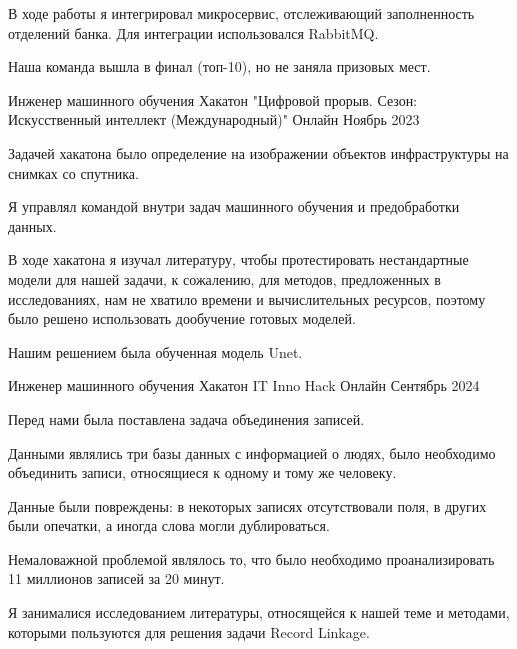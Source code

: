 \begin{cventries}
{\begin{cvitems}
    \item {В ходе работы я интегрировал микросервис, отслеживающий заполненность отделений банка. Для интеграции использовался RabbitMQ.}
    \item {Наша команда вышла в финал (топ-10), но не заняла призовых мест. }
  \end{cvitems}
}
\cventry
{Инженер машинного обучения} %
{Хакатон "Цифровой прорыв. Сезон: Искусственный интеллект (Международный)"} %
{Онлайн} %
{Ноябрь 2023} %
{
  \begin{cvitems} %
    \item {Задачей хакатона было определение на изображении объектов инфраструктуры на снимках со спутника. }
    \item {Я управлял командой внутри задач машинного обучения и предобработки данных. }
    \item {В ходе хакатона я изучал литературу, чтобы протестировать нестандартные модели для нашей задачи, к сожалению, для методов, предложенных в исследованиях, нам не хватило времени и вычислительных ресурсов, поэтому было решено использовать дообучение готовых моделей. }
    \item {Нашим решением была обученная модель Unet. } 
  \end{cvitems}
}
\cventry
{Инженер машинного обучения} %
{Хакатон IT Inno Hack} %
{Онлайн} %
{Сентябрь 2024} %
{
  \begin{cvitems} %
    \item {Перед нами была поставлена задача объединения записей. }
    \item {Данными являлись три базы данных с информацией о людях, было необходимо объединить записи, относящиеся к одному и тому же человеку. }
    \item {Данные были повреждены: в некоторых записях отсутствовали поля, в других были опечатки, а иногда слова могли дублироваться. }
    \item {Немаловажной проблемой являлось то, что было необходимо проанализировать 11 миллионов записей за 20 минут. }
    \item {Я занималися исследованием литературы, относящейся к нашей теме и методами, которыми пользуются для решения задачи Record Linkage. }

\end{cvitems}}
\end{cventries}
